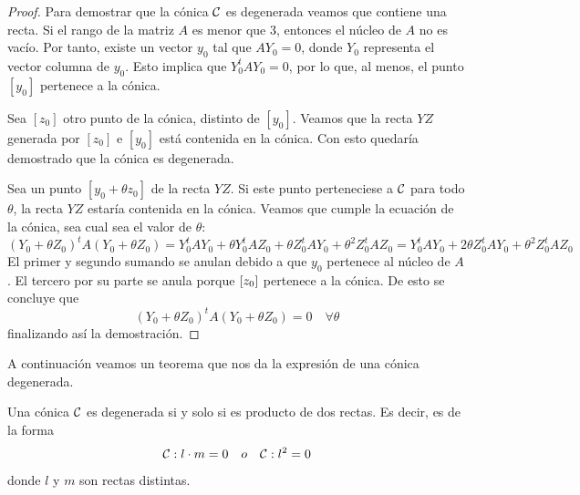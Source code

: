 \begin{proof}
	Para demostrar que la cónica $\mathcal{C}$ es degenerada veamos que contiene una recta. Si el rango de la matriz $A$ es menor que $3$, entonces el núcleo de $A$ no es vacío. Por tanto, existe un vector $y_0$ tal que $AY_0=0$, donde $Y_0$ representa el vector columna de $y_0$. Esto implica que $Y_0^tAY_0=0$, por lo que, al menos, el punto $[y_0]$ pertenece a la cónica.
	
	Sea $[z_0]$ otro punto de la cónica, distinto de $[y_0]$. Veamos que la recta $YZ$ generada por $[z_0]$ e $[y_0]$ está contenida en la cónica. Con esto quedaría demostrado que la cónica es degenerada.
	
	Sea un punto $[y_0+\theta z_0]$ de la recta $YZ$. Si este punto perteneciese a $\mathcal{C}$ para todo $\theta$, la recta $YZ$ estaría contenida en la cónica. Veamos que cumple la ecuación de la cónica, sea cual sea el valor de $\theta$:
	\begin{equation}\label{C8_eq_joanch_conicas_deg}
	(Y_0+\theta Z_0)^tA(Y_0+\theta Z_0)=Y_0^tAY_0+\theta Y_0^tAZ_0+\theta Z_0^tAY_0+\theta^2Z_0^tAZ_0=Y_0^tAY_0+2\theta Z_0^tAY_0+\theta^2Z_0^tAZ_0
	\end{equation}
	El primer y segundo sumando se anulan debido a que $y_0$ pertenece al núcleo de $A$. El tercero por su parte se anula porque $\left [ z_0 \right ]$ pertenece a la cónica. De esto se concluye que
	\begin{equation}
	(Y_0+\theta Z_0)^tA(Y_0+\theta Z_0)=0 \quad \forall\theta
	\end{equation}
	finalizando así la demostración.
\end{proof}

A continuación veamos un teorema que nos da la expresión de una cónica degenerada.

\begin{theo}\label{C8_theo_conica_degenerada_es_producto_rectas}
	Una cónica $\mathcal{C}$ es degenerada si y solo si es producto de dos rectas. Es decir, es de la forma
	\begin{equation}
	\mathcal{C}:l\cdot m=0 \quad o \quad \mathcal{C}:l^2=0
	\end{equation}
	donde $l$ y $m$ son rectas distintas.
\end{theo}

